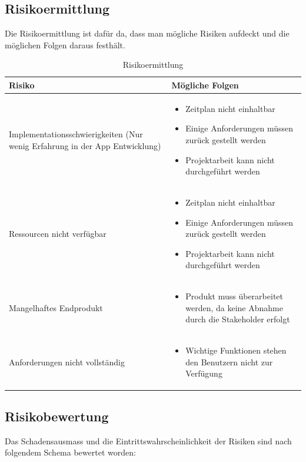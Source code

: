\subsection{Risikoermittlung}\label{risikoermittlung}
Die Risikoermittlung ist dafür da, dass man mögliche Risiken aufdeckt und die möglichen Folgen daraus festhält.

\begin{table}[ht]
\centering
  \begin{tabular}{  p{5cm} | p{9cm} }
	\hline
	\rowcolor{gray}
	Risiko							&	Mögliche Folgen	\\ \hline
	Implementationsschwierigkeiten (Nur wenig Erfahrung in der App Entwicklung)
								&	\begin{itemize}
										\item Zeitplan nicht einhaltbar
										\item Einige Anforderungen müssen zurück gestellt werden
										\item Projektarbeit kann nicht durchgeführt werden
									\end{itemize}	\\ \hline
	Ressourcen nicht verfügbar
								&	\begin{itemize}
										\item Zeitplan nicht einhaltbar
										\item Einige Anforderungen müssen zurück gestellt werden
										\item Projektarbeit kann nicht durchgeführt werden
									\end{itemize}	\\ \hline
	Mangelhaftes Endprodukt		
								&	\begin{itemize}
										\item Produkt muss überarbeitet werden, da keine Abnahme durch die Stakeholder erfolgt
									\end{itemize}	\\ \hline	
	Anforderungen nicht vollständig	
								&	\begin{itemize}
										\item Wichtige Funktionen stehen den Benutzern nicht zur Verfügung
									\end{itemize}	\\ \hline			
  \end{tabular}
   \caption{Risikoermittlung}
\end{table}

\subsection{Risikobewertung}
Das Schadensausmass und die Eintrittswahrscheinlichkeit der Risiken sind nach folgendem Schema bewertet worden:

